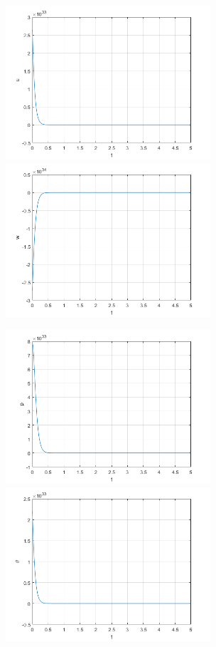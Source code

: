 \documentclass[12pt]{article}
\begin{document}
\newpage
\begin{multicols*}{2}
    \centering
    \includegraphics [width=3in]{Final_01.png}
    \includegraphics [width=3in]{Final_02.png}
    \vfill
    \columnbreak

    \includegraphics [width=3in]{Final_03.png}
    \includegraphics [width=3in]{Final_04.png}

\end{multicols*}
\end{document}
